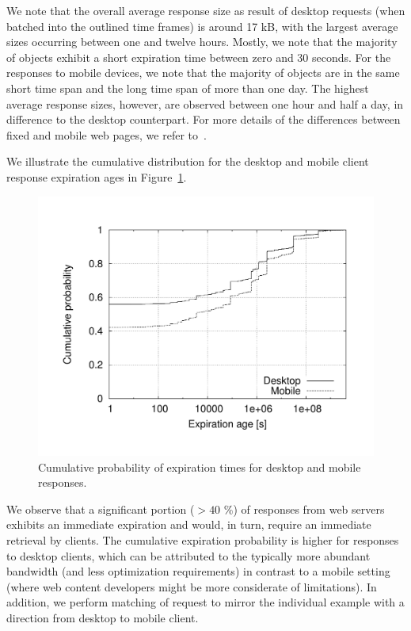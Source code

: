 \documentclass[letterpaper,conference]{IEEEtran}
\begin{document}
We note that the overall average response size as result of desktop requests (when batched into the outlined time frames) is around 17 kB, with the largest average sizes occurring between one and twelve hours.
Mostly, we note that the majority of objects exhibit a short expiration time between zero and 30 seconds.
For the responses to mobile devices, we note that the majority of objects are in the same short time span and the long time span of more than one day.
The highest average response sizes, however, are observed between one hour and half a day, in difference to the desktop counterpart.
For more details of the differences between fixed and mobile web pages, we refer to~\cite{JoSe14Commag}.

We illustrate the cumulative distribution for the desktop and mobile client response expiration ages in Figure~\ref{fig:comp_cpd}.
\begin{figure}
	\centering
	\includegraphics[width=.925\linewidth]{comp_cpd}
	\caption{Cumulative probability of expiration times for desktop and mobile responses.}
	\label{fig:comp_cpd}
\end{figure}
We observe that a significant portion ($>40$ \%) of responses from web servers exhibits an immediate expiration and would, in turn, require an immediate retrieval by clients.
The cumulative expiration probability is higher for responses to desktop clients, which can be attributed to the typically more abundant bandwidth (and less optimization requirements) in contrast to a mobile setting (where web content developers might be more considerate of limitations).
In addition, we perform matching of request to mirror the individual example with a direction from desktop to mobile client. 
\end{document}
